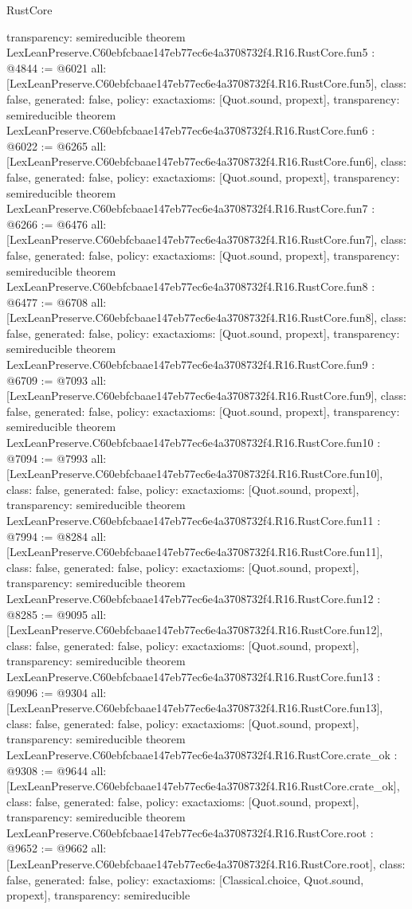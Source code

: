 \begin{lexlean}{RustCore}
\begin{coremodule}
{  transparency: semireducible
}
theorem LexLeanPreserve.C60ebfcbaae147eb77ec6e4a3708732f4.R16.RustCore.fun5 : @4844 := @6021 {
  all: [LexLeanPreserve.C60ebfcbaae147eb77ec6e4a3708732f4.R16.RustCore.fun5],
  class: false,
  generated: false,
  policy: exact{axioms: [Quot.sound, propext]},
  transparency: semireducible
}
theorem LexLeanPreserve.C60ebfcbaae147eb77ec6e4a3708732f4.R16.RustCore.fun6 : @6022 := @6265 {
  all: [LexLeanPreserve.C60ebfcbaae147eb77ec6e4a3708732f4.R16.RustCore.fun6],
  class: false,
  generated: false,
  policy: exact{axioms: [Quot.sound, propext]},
  transparency: semireducible
}
theorem LexLeanPreserve.C60ebfcbaae147eb77ec6e4a3708732f4.R16.RustCore.fun7 : @6266 := @6476 {
  all: [LexLeanPreserve.C60ebfcbaae147eb77ec6e4a3708732f4.R16.RustCore.fun7],
  class: false,
  generated: false,
  policy: exact{axioms: [Quot.sound, propext]},
  transparency: semireducible
}
theorem LexLeanPreserve.C60ebfcbaae147eb77ec6e4a3708732f4.R16.RustCore.fun8 : @6477 := @6708 {
  all: [LexLeanPreserve.C60ebfcbaae147eb77ec6e4a3708732f4.R16.RustCore.fun8],
  class: false,
  generated: false,
  policy: exact{axioms: [Quot.sound, propext]},
  transparency: semireducible
}
theorem LexLeanPreserve.C60ebfcbaae147eb77ec6e4a3708732f4.R16.RustCore.fun9 : @6709 := @7093 {
  all: [LexLeanPreserve.C60ebfcbaae147eb77ec6e4a3708732f4.R16.RustCore.fun9],
  class: false,
  generated: false,
  policy: exact{axioms: [Quot.sound, propext]},
  transparency: semireducible
}
theorem LexLeanPreserve.C60ebfcbaae147eb77ec6e4a3708732f4.R16.RustCore.fun10 : @7094 := @7993 {
  all: [LexLeanPreserve.C60ebfcbaae147eb77ec6e4a3708732f4.R16.RustCore.fun10],
  class: false,
  generated: false,
  policy: exact{axioms: [Quot.sound, propext]},
  transparency: semireducible
}
theorem LexLeanPreserve.C60ebfcbaae147eb77ec6e4a3708732f4.R16.RustCore.fun11 : @7994 := @8284 {
  all: [LexLeanPreserve.C60ebfcbaae147eb77ec6e4a3708732f4.R16.RustCore.fun11],
  class: false,
  generated: false,
  policy: exact{axioms: [Quot.sound, propext]},
  transparency: semireducible
}
theorem LexLeanPreserve.C60ebfcbaae147eb77ec6e4a3708732f4.R16.RustCore.fun12 : @8285 := @9095 {
  all: [LexLeanPreserve.C60ebfcbaae147eb77ec6e4a3708732f4.R16.RustCore.fun12],
  class: false,
  generated: false,
  policy: exact{axioms: [Quot.sound, propext]},
  transparency: semireducible
}
theorem LexLeanPreserve.C60ebfcbaae147eb77ec6e4a3708732f4.R16.RustCore.fun13 : @9096 := @9304 {
  all: [LexLeanPreserve.C60ebfcbaae147eb77ec6e4a3708732f4.R16.RustCore.fun13],
  class: false,
  generated: false,
  policy: exact{axioms: [Quot.sound, propext]},
  transparency: semireducible
}
theorem LexLeanPreserve.C60ebfcbaae147eb77ec6e4a3708732f4.R16.RustCore.crate_ok : @9308 := @9644 {
  all: [LexLeanPreserve.C60ebfcbaae147eb77ec6e4a3708732f4.R16.RustCore.crate_ok],
  class: false,
  generated: false,
  policy: exact{axioms: [Quot.sound, propext]},
  transparency: semireducible
}
theorem LexLeanPreserve.C60ebfcbaae147eb77ec6e4a3708732f4.R16.RustCore.root : @9652 := @9662 {
  all: [LexLeanPreserve.C60ebfcbaae147eb77ec6e4a3708732f4.R16.RustCore.root],
  class: false,
  generated: false,
  policy: exact{axioms: [Classical.choice, Quot.sound, propext]},
  transparency: semireducible
}


\end{coremodule}
\end{lexlean}
